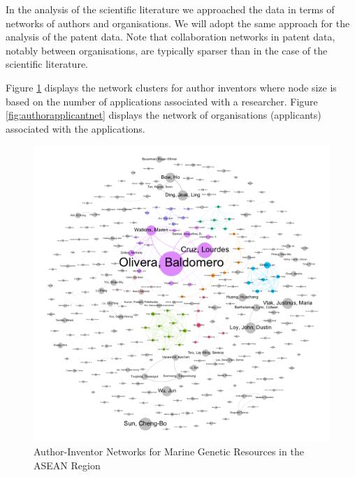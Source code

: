 \documentclass[openany]{book}
\theoremstyle{definition}
\theoremstyle{definition}
\theoremstyle{definition}
\theoremstyle{remark}
\begin{document}
In the analysis of the scientific literature we approached the data in
terms of networks of authors and organisations. We will adopt the same
approach for the analysis of the patent data. Note that collaboration
networks in patent data, notably between organisations, are typically
sparser than in the case of the scientific literature.

Figure \ref{fig:authorinventornet} displays the network clusters for
author inventors where node size is based on the number of applications
associated with a researcher. Figure \ref{fig:authorapplicantnet}
displays the network of organisations (applicants) associated with the
applications.

\begin{figure}

{\centering \includegraphics[width=1\linewidth]{images-patents/author_inventor_network} 

}

\caption{Author-Inventor Networks for Marine Genetic Resources in the ASEAN Region}\label{fig:authorinventornet}
\end{figure}
\end{document}
